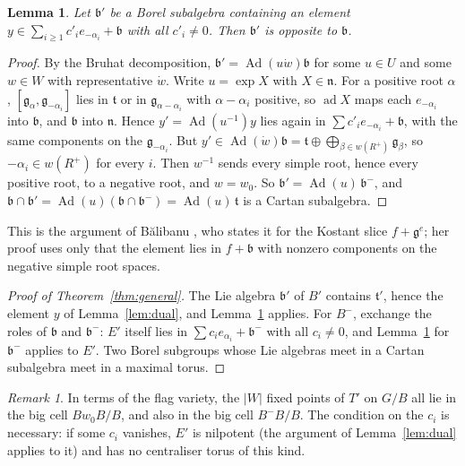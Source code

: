 \documentclass[11pt,a4paper]{amsart}
\newtheorem{lemma}[theorem]{Lemma}
\theoremstyle{definition}
\theoremstyle{remark}
\newtheorem{remark}[theorem]{Remark}
\begin{document}
\begin{lemma}\label{lem:opposite}
Let $\mathfrak b'$ be a Borel subalgebra containing an element $y \in \sum_{i\ge1} c'_i e_{-\alpha_i} + \mathfrak b$ with all $c'_i \neq 0$. Then $\mathfrak b'$ is opposite to $\mathfrak b$.
\end{lemma}
\begin{proof}
By the Bruhat decomposition, $\mathfrak b' = \operatorname{Ad}(u\dot w)\mathfrak b$ for some $u \in U$ and some $w \in W$ with representative $\dot w$. Write $u = \exp X$ with $X \in \mathfrak n$. For a positive root $\alpha$, $[\mathfrak g_\alpha, \mathfrak g_{-\alpha_i}]$ lies in $\mathfrak t$ or in $\mathfrak g_{\alpha-\alpha_i}$ with $\alpha - \alpha_i$ positive, so $\operatorname{ad}X$ maps each $e_{-\alpha_i}$ into $\mathfrak b$, and $\mathfrak b$ into $\mathfrak n$. Hence $y' = \operatorname{Ad}(u^{-1})y$ lies again in $\sum c'_i e_{-\alpha_i} + \mathfrak b$, with the same components on the $\mathfrak g_{-\alpha_i}$. But $y' \in \operatorname{Ad}(\dot w)\mathfrak b = \mathfrak t \oplus \bigoplus_{\beta\in w(R^+)}\mathfrak g_\beta$, so $-\alpha_i \in w(R^+)$ for every $i$. Then $w^{-1}$ sends every simple root, hence every positive root, to a negative root, and $w = w_0$. So $\mathfrak b' = \operatorname{Ad}(u)\,\mathfrak b^-$, and $\mathfrak b \cap \mathfrak b' = \operatorname{Ad}(u)(\mathfrak b \cap \mathfrak b^-) = \operatorname{Ad}(u)\,\mathfrak t$ is a Cartan subalgebra.
\end{proof}

This is the argument of B\u{a}libanu \cite[Lemma~4.5]{balibanu}, who states it for the Kostant slice $f + \mathfrak g^e$; her proof uses only that the element lies in $f + \mathfrak b$ with nonzero components on the negative simple root spaces.

\begin{proof}[Proof of Theorem~\ref{thm:general}]
The Lie algebra $\mathfrak b'$ of $B'$ contains $\mathfrak t'$, hence the element $y$ of Lemma~\ref{lem:dual}, and Lemma~\ref{lem:opposite} applies. For $B^-$, exchange the roles of $\mathfrak b$ and $\mathfrak b^-$: $E'$ itself lies in $\sum c_i e_{\alpha_i} + \mathfrak b^-$ with all $c_i \neq 0$, and Lemma~\ref{lem:opposite} for $\mathfrak b^-$ applies to $E'$. Two Borel subgroups whose Lie algebras meet in a Cartan subalgebra meet in a maximal torus.
\end{proof}

\begin{remark}\label{rem:flag}
In terms of the flag variety, the $|W|$ fixed points of $T'$ on $G/B$ all lie in the big cell $Bw_0B/B$, and also in the big cell $B^-B/B$. The condition on the $c_i$ is necessary: if some $c_i$ vanishes, $E'$ is nilpotent (the argument of Lemma~\ref{lem:dual} applies to it) and has no centraliser torus of this kind.
\end{remark}
\end{document}
